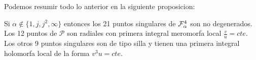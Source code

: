 Podemos resumir todo lo anterior en la siguiente proposicion:

\begin{Proposicion}
\label{Prop:2}

Si $\alpha \notin \{1,j,j^{2},\infty \}$ entonces los 21 puntos singulares de $\Fol[4]{\alpha}$  son no degenerados. Los 12 puntos de $\mathcal{P}$ son radiales con primera integral meromorfa local $\frac{v}{u} = cte$. Los otros 9 puntos singulares son de tipo silla y tienen una primera integral holomorfa local de la forma $v^{3}u = cte$.

\end{Proposicion}




